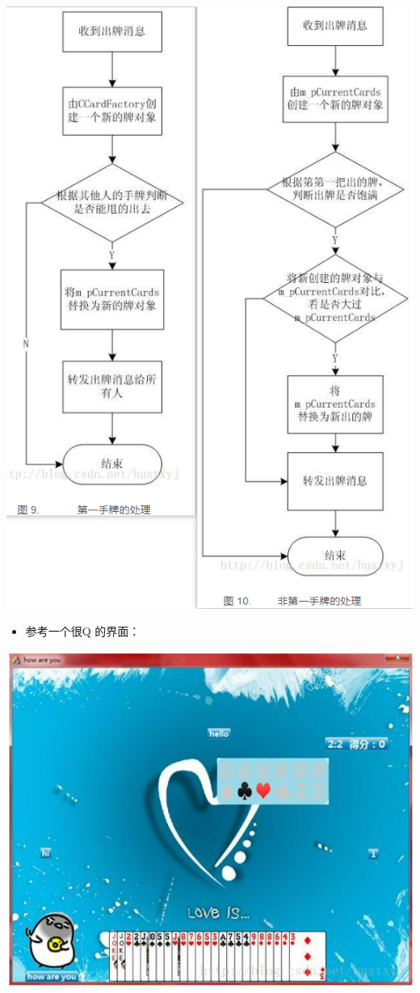 \documentclass[9pt, b5paper]{article}
\begin{document}
\begin{center}
\includegraphics[width=.9\linewidth]{./pic/plan_20230508_223827.png}
\end{center}

\begin{itemize}
\item 参考一个很Q 的界面：
\end{itemize}

\begin{center}
\includegraphics[width=.9\linewidth]{./pic/plan_20230508_222717.png}
\end{center}
\end{document}
